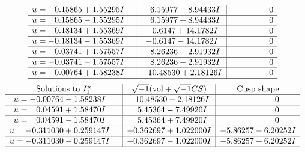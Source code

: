 \documentclass[1p]{elsarticle_modified}
\theoremstyle{definition}
\newcommand{\I}{\sqrt{-1}}
\begin{document}
$$\begin{array}{c|c|c}
\begin{aligned}
u &= \phantom{-}0.15865 + 1.55295 I\end{aligned}
 & \phantom{-}6.15977 - 8.94433 I & \phantom{-0.000000 } 0 \\ \hline\begin{aligned}
u &= \phantom{-}0.15865 - 1.55295 I\end{aligned}
 & \phantom{-}6.15977 + 8.94433 I & \phantom{-0.000000 } 0 \\ \hline\begin{aligned}
u &= -0.18134 + 1.55369 I\end{aligned}
 & -0.6147 + 14.1782 I & \phantom{-0.000000 } 0 \\ \hline\begin{aligned}
u &= -0.18134 - 1.55369 I\end{aligned}
 & -0.6147 - 14.1782 I & \phantom{-0.000000 } 0 \\ \hline\begin{aligned}
u &= -0.03741 + 1.57557 I\end{aligned}
 & \phantom{-}8.26236 + 2.91932 I & \phantom{-0.000000 } 0 \\ \hline\begin{aligned}
u &= -0.03741 - 1.57557 I\end{aligned}
 & \phantom{-}8.26236 - 2.91932 I & \phantom{-0.000000 } 0 \\ \hline\begin{aligned}
u &= -0.00764 + 1.58238 I\end{aligned}
 & \phantom{-}10.48530 + 2.18126 I & \phantom{-0.000000 } 0\\
 \hline 
 \end{array}$$\newpage$$\begin{array}{c|c|c}  
\text{Solutions to }I^u_{1}& \I (\text{vol} + \sqrt{-1}CS) & \text{Cusp shape}\\
 \hline 
\begin{aligned}
u &= -0.00764 - 1.58238 I\end{aligned}
 & \phantom{-}10.48530 - 2.18126 I & \phantom{-0.000000 } 0 \\ \hline\begin{aligned}
u &= \phantom{-}0.04591 + 1.58470 I\end{aligned}
 & \phantom{-}5.45364 - 7.49920 I & \phantom{-0.000000 } 0 \\ \hline\begin{aligned}
u &= \phantom{-}0.04591 - 1.58470 I\end{aligned}
 & \phantom{-}5.45364 + 7.49920 I & \phantom{-0.000000 } 0 \\ \hline\begin{aligned}
u &= -0.311030 + 0.259147 I\end{aligned}
 & -0.362697 + 1.022000 I & -5.86257 - 6.20252 I \\ \hline\begin{aligned}
u &= -0.311030 - 0.259147 I\end{aligned}
 & -0.362697 - 1.022000 I & -5.86257 + 6.20252 I\\
 \hline 
 \end{array}$$\newpage
\end{document}
